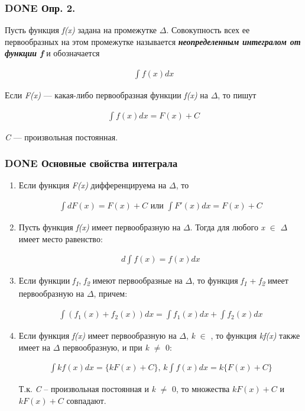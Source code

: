\documentclass[11pt]{article}
\begin{document}
\subsubsection{{\bfseries\sffamily DONE} Опр. 2.}
\label{sec:orgb78cb62}
Пусть функция \emph{f(x)} задана на промежутке \(\Delta\). Совокупность всех ее первообразных на этом промежутке называется \emph{\textbf{неопределенным интегралом от функции \emph{f}}} и обозначается

\begin{eqnarray}
\int f(x)dx
\end{eqnarray}

Если \emph{F(x)} — какая-либо первообразная функции \emph{f(x)} на \(\Delta\), то пишут

\begin{eqnarray}
\int f(x)dx=F(x)+C
\end{eqnarray}

\emph{C} — произвольная постоянная.

\subsubsection{{\bfseries\sffamily DONE} Основные свойства интеграла}
\label{sec:orge9de84c}
\begin{enumerate}
\item Если функция \emph{F(x)} дифференцируема на \(\Delta\), то
\label{sec:orgd230b3a}

\begin{eqnarray}
\int dF(x)=F(x)+C \text{ или }\int F'(x)dx=F(x)+C
\end{eqnarray}

\item Пусть функция \emph{f(x)} имеет первообразную на \(\Delta\). Тогда для любого \emph{x} \(\in\) \(\Delta\) имеет место равенство:
\label{sec:orga749ffb}

\begin{eqnarray}
d\int f(x)=f(x)dx
\end{eqnarray}

\item Если функции \emph{f\textsubscript{1}}, \emph{f\textsubscript{2}} имеют первообразные на \(\Delta\), то функция \emph{f\textsubscript{1}} + \emph{f\textsubscript{2}} имеет первообразную на \(\Delta\), причем:
\label{sec:org86be137}

\begin{eqnarray}
\int(f_1(x) + f_2(x))dx=\int f_1(x)dx + \int f_2(x)dx
\end{eqnarray}

\item Если функция \emph{f(x)} имеет первообразную на \(\Delta\), \emph{k} \(\in\) \emph{\R}, то функция \emph{kf(x)} также имеет на \(\Delta\) первообразную, и при \emph{k} \(\ne\) 0:
\label{sec:org33de2aa}

\begin{gather*}
\int kf(x)dx=\{kF(x)+C\}\text{, }k\int f(x)dx=k\{F(x)+C\}
\end{gather*}

Т.к. \emph{C} – произвольная постоянная и \emph{k} \(\ne\) 0, то множества \({kF(x) + C}\) и \(k{F(x) + C}\) совпадают.
\end{enumerate}
\end{document}

